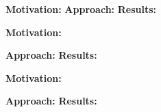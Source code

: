 
\rqi

\noindent \textbf{Motivation:} 
\noindent \textbf{Approach:} 
\noindent \textbf{Results:} 

\rqii

\noindent \textbf{Motivation:} 
\par \noindent \textbf{Approach:} 
\noindent \textbf{Results:} 


\rqiii

\noindent \textbf{Motivation:} 
\par \noindent \textbf{Approach:} 
\noindent \textbf{Results:} 